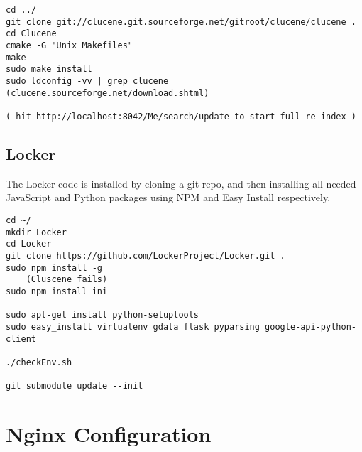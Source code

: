 \documentclass[A4paper,11pt]{article}
\begin{document}
\begin{lstlisting}
cd ../
git clone git://clucene.git.sourceforge.net/gitroot/clucene/clucene .
cd Clucene
cmake -G "Unix Makefiles"
make
sudo make install
sudo ldconfig -vv | grep clucene
(clucene.sourceforge.net/download.shtml)

( hit http://localhost:8042/Me/search/update to start full re-index )

\end{lstlisting}

\subsection{Locker}
\label{subsec:Locker}

The Locker code is installed by cloning a git repo, and then installing all needed JavaScript and Python packages using NPM and Easy Install respectively.

\begin{lstlisting}
cd ~/
mkdir Locker
cd Locker
git clone https://github.com/LockerProject/Locker.git .
sudo npm install -g
    (Cluscene fails)
sudo npm install ini

sudo apt-get install python-setuptools
sudo easy_install virtualenv gdata flask pyparsing google-api-python-client

./checkEnv.sh

git submodule update --init

\end{lstlisting}

\newpage
\section{Nginx Configuration}
\label{sec:NginxConfiguration}
\end{document}
